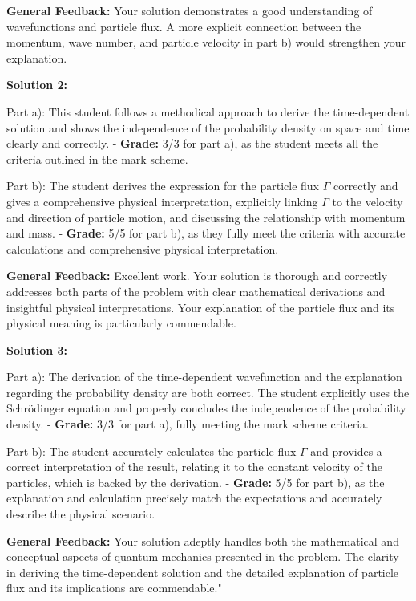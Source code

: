 \documentclass[a4paper,11pt]{article}
\begin{document}
\textbf{General Feedback:} Your solution demonstrates a good understanding of wavefunctions and particle flux. A more explicit connection between the momentum, wave number, and particle velocity in part b) would strengthen your explanation.

\hrulefill

\textbf{Solution 2:}

Part a): This student follows a methodical approach to derive the time-dependent solution and shows the independence of the probability density on space and time clearly and correctly.
- \textbf{Grade:} 3/3 for part a), as the student meets all the criteria outlined in the mark scheme.

Part b): The student derives the expression for the particle flux $\Gamma$ correctly and gives a comprehensive physical interpretation, explicitly linking $\Gamma$ to the velocity and direction of particle motion, and discussing the relationship with momentum and mass.
- \textbf{Grade:} 5/5 for part b), as they fully meet the criteria with accurate calculations and comprehensive physical interpretation.

\textbf{General Feedback:} Excellent work. Your solution is thorough and correctly addresses both parts of the problem with clear mathematical derivations and insightful physical interpretations. Your explanation of the particle flux and its physical meaning is particularly commendable.

\hrulefill

\textbf{Solution 3:}

Part a): The derivation of the time-dependent wavefunction and the explanation regarding the probability density are both correct. The student explicitly uses the Schrödinger equation and properly concludes the independence of the probability density.
- \textbf{Grade:} 3/3 for part a), fully meeting the mark scheme criteria.

Part b): The student accurately calculates the particle flux $\Gamma$ and provides a correct interpretation of the result, relating it to the constant velocity of the particles, which is backed by the derivation.
- \textbf{Grade:} 5/5 for part b), as the explanation and calculation precisely match the expectations and accurately describe the physical scenario.

\textbf{General Feedback:} Your solution adeptly handles both the mathematical and conceptual aspects of quantum mechanics presented in the problem. The clarity in deriving the time-dependent solution and the detailed explanation of particle flux and its implications are commendable."
\end{document}
